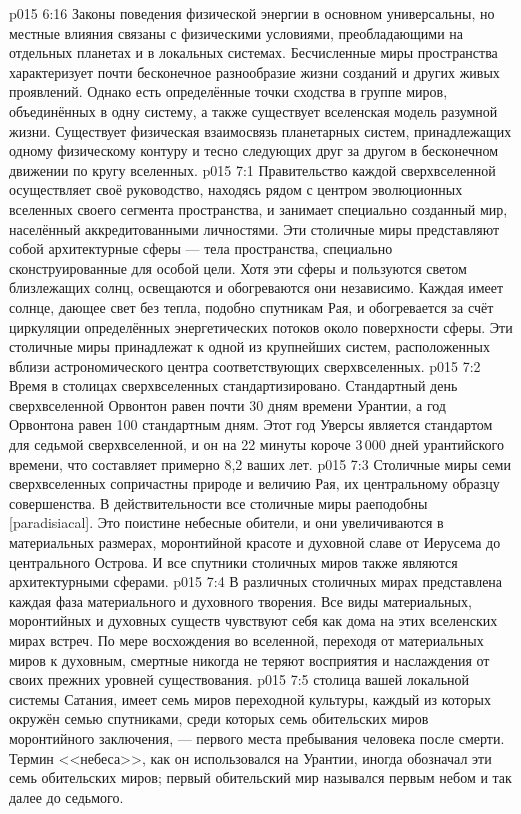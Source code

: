 \vs p015 6:16 Законы поведения физической энергии в основном универсальны, но местные влияния связаны с физическими условиями, преобладающими на отдельных планетах и в локальных системах. Бесчисленные миры пространства характеризует почти бесконечное разнообразие жизни созданий и других живых проявлений. Однако есть определённые точки сходства в группе миров, объединённых в одну систему, а также существует вселенская модель разумной жизни. Существует физическая взаимосвязь планетарных систем, принадлежащих одному физическому контуру и тесно следующих друг за другом в бесконечном движении по кругу вселенных.
\vs p015 7:1 Правительство каждой сверхвселенной осуществляет своё руководство, находясь рядом с центром эволюционных вселенных своего сегмента пространства, и занимает специально созданный мир, населённый аккредитованными личностями. Эти столичные миры представляют собой архитектурные сферы --- тела пространства, специально сконструированные для особой цели. Хотя эти сферы и пользуются светом близлежащих солнц, освещаются и обогреваются они независимо. Каждая имеет солнце, дающее свет без тепла, подобно спутникам Рая, и обогревается за счёт циркуляции определённых энергетических потоков около поверхности сферы. Эти столичные миры принадлежат к одной из крупнейших систем, расположенных вблизи астрономического центра соответствующих сверхвселенных.
\vs p015 7:2 \pc Время в столицах сверхвселенных стандартизировано. Стандартный день сверхвселенной Орвонтон равен почти 30 дням времени Урантии, а год Орвонтона равен 100 стандартным дням. Этот год Уверсы является стандартом для седьмой сверхвселенной, и он на 22 минуты короче 3\,000 дней урантийского времени, что составляет примерно 8,2 ваших лет.
\vs p015 7:3 \pc Столичные миры семи сверхвселенных сопричастны природе и величию Рая, их центральному образцу совершенства. В действительности все столичные миры раеподобны [paradisiacal]. Это поистине небесные обители, и они увеличиваются в материальных размерах, моронтийной красоте и духовной славе от Иерусема до центрального Острова. И все спутники столичных миров также являются архитектурными сферами.
\vs p015 7:4 В различных столичных мирах представлена каждая фаза материального и духовного творения. Все виды материальных, моронтийных и духовных существ чувствуют себя как дома на этих вселенских мирах встреч. По мере восхождения во вселенной, переходя от материальных миров к духовным, смертные никогда не теряют восприятия и наслаждения от своих прежних уровней существования.
\vs p015 7:5 \pc {} столица вашей локальной системы Сатания, имеет семь миров переходной культуры, каждый из которых окружён семью спутниками, среди которых семь обительских миров моронтийного заключения, --- первого места пребывания человека после смерти. Термин <<небеса>>, как он использовался на Урантии, иногда обозначал эти семь обительских миров; первый обительский мир назывался первым небом и так далее до седьмого.
